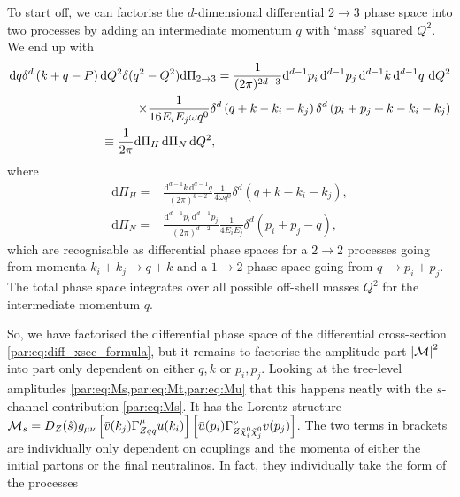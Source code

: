 \documentclass[../main.tex]{subfiles}
\begin{document}
To start off, we can factorise the \(d\)-dimensional differential \(2\to 3\) phase space into two processes by adding an intermediate momentum \(q\) with `mass' squared \(Q^2\).
We end up with
\begin{align}
  \nonumber
  \mathrm{d}q \delta^d\pclosed{k+q-P} \mathrm{d}Q^2 \delta(q^2-Q^2) \mathrm{d}\Pi_{2\to 3} = \frac{1}{(2\pi)^{2d-3}}\mathrm{d}^{d-1}p_i\,\mathrm{d}^{d-1}p_j\,\mathrm{d}^{d-1}k\,\mathrm{d}^{d-1}q\,\,\mathrm{d}Q^2 \\
  \nonumber
  \times \frac{1}{16E_iE_j\omega q^0} \delta^d\pclosed{q+k - k_i-k_j}\delta^d\pclosed{p_i+p_j+k - k_i-k_j}                                                                                                          \\
  \equiv                                                                                       \frac{1}{2\pi} \mathrm{d}\Pi_H\, \mathrm{d}\Pi_N\, \mathrm{d}Q^2,\hspace{6.7cm}
\end{align}
where
\begin{subequations}
  \begin{align}
    \mathrm{d}\Pi_H = & \frac{\mathrm{d}^{d-1}k\, \mathrm{d}^{d-1}q}{(2\pi)^{d-2}} \frac{1}{4\omega q^0} \delta^d(q+k-k_i-k_j), \\
    \mathrm{d}\Pi_N = & \frac{\mathrm{d}^{d-1}p_i\, \mathrm{d}^{d-1}p_j}{(2\pi)^{d-2}} \frac{1}{4E_iE_j} \delta^d(p_i+p_j-q),
  \end{align}
\end{subequations}
which are recognisable as differential phase spaces for a \(2\to 2\) processes going from momenta \(k_i+k_j \to q+k\) and a \(1\to 2\) phase space going from \(q\ \to p_i+p_j\).
The total phase space integrates over all possible off-shell masses \(Q^2\) for the intermediate momentum \(q\).

So, we have factorised the differential phase space of the differential cross-section \cref{par:eq:diff_xsec_formula}, but it remains to factorise the amplitude part \(\left|\mathcal{M}\right|^2\) into part only dependent on either \(q, k\) or \(p_i, p_j\).
Looking at the tree-level amplitudes \cref{par:eq:Ms,par:eq:Mt,par:eq:Mu} that this happens neatly with the \(s\)-channel contribution \cref{par:eq:Ms}.
It has the Lorentz structure \(\mathcal{M}_s = D_Z(\hat{s}) g_{\mu\nu} \left[\bar{v}(k_j)\Gamma_{Zqq}^\mu u(k_i)\right] \left[\bar{u}(p_i)\Gamma_{Z\tilde{\chi}_i^0 \tilde{\chi}_j^0}^\nu v(p_j)\right]\).
The two terms in brackets are individually only dependent on couplings and the momenta of either the initial partons or the final neutralinos.
In fact, they individually take the form of the processes
\end{document}
